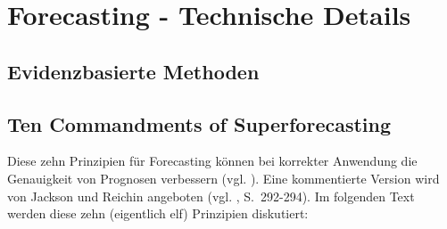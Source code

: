 \chapter{Forecasting - Technische Details}

\section{Evidenzbasierte Methoden}






\section{Ten Commandments of Superforecasting}

Diese zehn Prinzipien für Forecasting können bei korrekter Anwendung die Genauigkeit von
Prognosen verbessern (vgl. \cite{Ten_Comm}). Eine kommentierte Version wird von Jackson und Reichin
angeboten (vgl. \cite{Jackson}, S.~292-294). Im folgenden Text werden diese zehn (eigentlich elf)
Prinzipien diskutiert:

